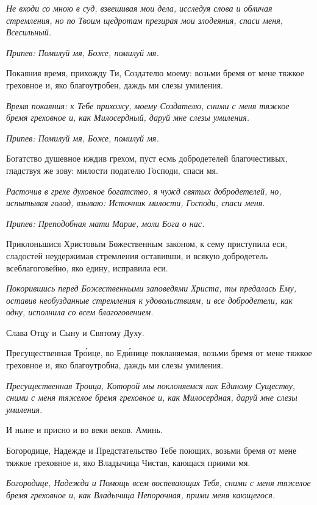 \itshape Не входи со мною в суд, взвешивая мои дела, исследуя слова и обличая стремления, но по Твоим щедротам презирая мои злодеяния, спаси меня, Всесильный.\normalfont{}


\itshape Припев:\normalfont{} Помилуй мя, Боже, помилуй мя.


Покаяния время, прихожду Ти, Создателю моему: возьми бремя от мене тяжкое греховное и, яко благоутробен, даждь ми слезы умиления.


\itshape Время покаяния: к Тебе прихожу, моему Создателю, сними с меня тяжкое бремя греховное и, как Милосердный, даруй мне слезы умиления.\normalfont{}


\itshape Припев:\normalfont{} Помилуй мя, Боже, помилуй мя.


Богатство душевное иждив грехом, пуст есмь добродетелей благочестивых, гладствуя же зову: милости подателю Господи, спаси мя.


\itshape Расточив в грехе духовное богатство, я чужд святых добродетелей, но, испытывая голод, взываю: Источник милости, Господи, спаси меня.\normalfont{}


\itshape Припев:\normalfont{} Преподобная мати Марие, моли Бога о нас.


Приклоньшися Христовым Божественным законом, к сему приступила еси, сладостей неудержимая стремления оставивши, и всякую добродетель всеблагоговейно, яко едину, исправила еси.


\itshape Покорившись перед Божественными заповедями Христа, ты предалась Ему, оставив необузданные стремления к удовольствиям, и все добродетели, как одну, исполнила со всем благоговением.\normalfont{}


Слава Отцу и Сыну и Святому Духу.


Пресущественная Тро́ице, во Еди́нице покланяемая, возьми бремя от мене тяжкое греховное и, яко благоутробна, даждь ми слезы умиления.


\itshape Пресущественная Троица, Которой мы поклоняемся как Единому Существу, сними с меня тяжелое бремя греховное и, как Милосердная, даруй мне слезы умиления.\normalfont{}


И ныне и присно и во веки веков. Аминь.


Богородице, Надежде и Предстательство Тебе поющих, возьми бремя от мене тяжкое греховное и, яко Владычица Чистая, кающася приими мя.


\itshape Богородице, Надежда и Помощь всем воспевающих Тебя, сними с меня тяжелое бремя греховное и, как Владычица Непорочная, прими меня кающегося.\normalfont{}





